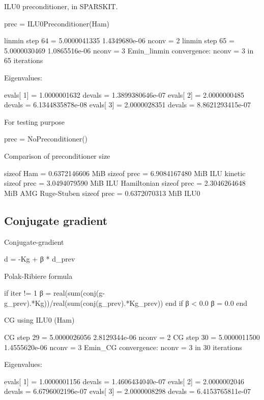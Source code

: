 ILU0 preconditioner, in SPARSKIT.
\begin{juliacode}
prec = ILU0Preconditioner(Ham)
\end{juliacode}

\begin{textcode}
linmin step       64 =       5.0000041335   1.4349680e-06  nconv =     2
linmin step       65 =       5.0000030469   1.0865516e-06  nconv =     3
Emin_linmin convergence: nconv =     3 in    65 iterations

Eigenvalues:

evals[  1] =       1.0000001632 devals =   1.3899380646e-07
evals[  2] =       2.0000000485 devals =   6.1344835878e-08
evals[  3] =       2.0000028351 devals =   8.8621293415e-07
\end{textcode}


For testing purpose
\begin{juliacode}
prec = NoPreconditioner()
\end{juliacode}

Comparison of preconditioner size
\begin{textcode}
sizeof Ham  =       0.6372146606 MiB
sizeof prec =       6.9084167480 MiB  ILU kinetic
sizeof prec =       3.0494079590 MiB  ILU Hamiltonian
sizeof prec =       2.3046264648 MiB  AMG Ruge-Stuben
sizeof prec =       0.6372070313 MiB  ILU0
\end{textcode}


\subsection{Conjugate gradient}

Conjugate-gradient

\begin{textcode}
d = -Kg + β * d_prev
\end{textcode}

Polak-Ribiere formula
\begin{juliacode}
if iter != 1
  β = real(sum(conj(g-g_prev).*Kg))/real(sum(conj(g_prev).*Kg_prev))
end
if β < 0.0 β = 0.0 end
\end{juliacode}

CG using ILU0 (Ham)
\begin{textcode}
CG step       29 =       5.0000026056   2.8129344e-06  nconv =     2
CG step       30 =       5.0000011500   1.4555620e-06  nconv =     3
Emin_CG convergence: nconv =     3 in    30 iterations
  
Eigenvalues:
  
evals[  1] =       1.0000001156 devals =   1.4606434040e-07
evals[  2] =       2.0000002046 devals =   6.6796002196e-07
evals[  3] =       2.0000008298 devals =   6.4153765811e-07  
\end{textcode}

